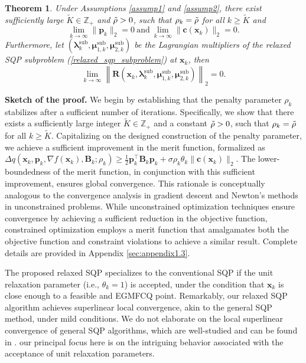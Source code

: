 \documentclass[aos]{imsart}
\numberwithin{equation}{section}
\theoremstyle{plain}
\newtheorem{theorem}{Theorem}
\begin{document}
\begin{theorem}
\label{theorem_det_sqp}
Under Assumptions \ref{assump1} and \ref{assump2}, there exist sufficiently large $\widetilde{K} \in \mathbb{Z}_{+}$ and $\Tilde{\rho}>0$, such that $\rho_k = \Tilde{\rho}$ for all $k \geq \widetilde{K}$ and 
\begin{equation}
\label{eq4}
    \lim_{k \to \infty} \|\bm{p}_k\|_2 = 0~\text{and}~ \lim_{k \to \infty} \|\bm{c}(\bm{x}_k)\|_2 = 0.
\end{equation}
Furthermore, let $(\bm{\lambda}_k^{\text{sub}}, \bm{\mu}_{1,k}^{\text{sub}},\bm{\mu}_{2,k}^{\text{sub}})$ be the Lagrangian multipliers of the relaxed SQP subproblem (\ref{relaxed_sqp_subproblem}) at $\bm{x}_k$, then 
\begin{equation}
\label{eq5}
    \lim_{k \to \infty} \left\| \bm{R}(\bm{x}_k, \bm{\lambda}_k^{\text{sub}}, \bm{\mu}_{1,k}^{\text{sub}}, \bm{\mu}_{2,k}^{\text{sub}}) \right\|_2 = 0.
\end{equation}
\end{theorem}


\textbf{Sketch of the proof.} We begin by establishing that the penalty parameter $\rho_k$ stabilizes after a sufficient number of iterations. Specifically, we show that there exists a sufficiently large integer $\widetilde{K} \in \mathbb{Z}_{+}$ and a constant $\Tilde{\rho} > 0$, such that $\rho_k = \Tilde{\rho}$ for all $k \geq \widetilde{K}$.
Capitalizing on the designed construction of the penalty parameter, we achieve a sufficient improvement in the merit function, formalized as $\Delta q(\bm{x}_k,\bm{p}_k,\nabla f(\bm{x}_k),\bm{B}_k;\rho_k) \geq \frac{1}{2} \bm{p}_k^{\top} \bm{B}_k \bm{p}_k + \sigma \rho_k \theta_k \|\bm{c}(\bm{x}_k)\|_2$. The lower-boundedness of the merit function, in conjunction with this sufficient improvement, ensures global convergence. This rationale is conceptually analogous to the convergence analysis in gradient descent and Newton's methods in unconstrained problems. 
While unconstrained optimization techniques ensure convergence by achieving a sufficient reduction in the objective function, constrained optimization employs a merit function that amalgamates both the objective function and constraint violations to achieve a similar result. Complete details are provided in Appendix \ref{sec:appendix1.3}.


The proposed relaxed SQP specializes to the conventional SQP if the unit relaxation parameter (i.e., $\theta_k =1$) is accepted, under the condition that $\bm{x}_k$ is close enough to a feasible and EGMFCQ point. Remarkably, our relaxed SQP algorithm achieves superlinear local convergence, akin to the general SQP method, under mild conditions. 
We do not elaborate on the local superlinear convergence of general SQP algorithms, which are well-studied and can be found in \cite{jorge2006numerical, ulbrich2004superlinear, boggs1995sequential, liu2011sequential, schittkowski2010sequential}. 
our principal focus here is on the intriguing behavior associated with the acceptance of unit relaxation parameters. 
\end{document}
